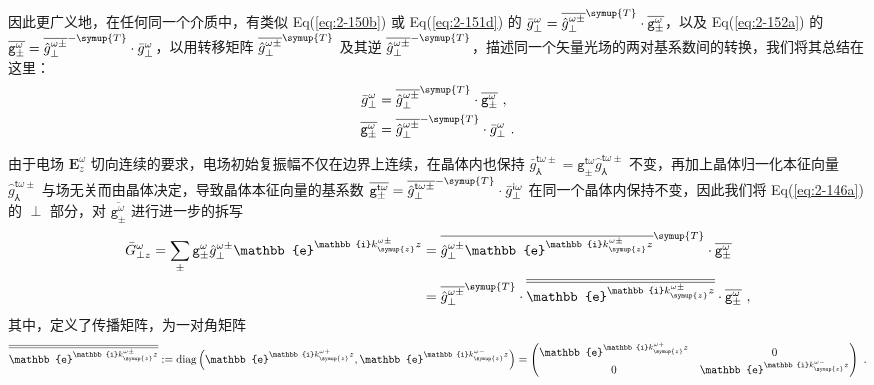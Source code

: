 因此更广义地，在任何同一个介质中，有类似 Eq(\ref{eq:2-150b}) 或 Eq(\ref{eq:2-151d}) 的 $\bar{g}^{\omega}_{\perp} = \overline{\hat{g}^{\omega\pm}_{\perp}}^{\symup{T}} \cdot \overline{{\mathtt{g}}^{\omega}_{\pm}}$，以及 Eq(\ref{eq:2-152a}) 的 $\overline{{\mathtt{g}}^{\omega}_{\pm}} = \overline{\hat{g}^{\omega\pm}_{\perp}}^{-\symup{T}} \cdot \bar{g}^{\omega}_{\perp}$，以用转移矩阵 $\overline{\hat{g}^{\omega\pm}_{\perp}}^{\symup{T}}$ 及其逆 $\overline{\hat{g}^{\omega\pm}_{\perp}}^{-\symup{T}}$，描述同一个矢量光场的两对基系数间的转换，我们将其总结在这里：
\begin{subequations} \label{eq:2-153}
	\abovedisplayskip=10pt
	\belowdisplayskip=10pt
	\begin{align}
		\bar{g}^{\omega}_{\perp} &= \overline{\hat{g}^{\omega\pm}_{\perp}}^{\symup{T}} \cdot \overline{{\mathtt{g}}^{\omega}_{\pm}} \label{eq:2-153a}~,\\ \overline{{\mathtt{g}}^{\omega}_{\pm}} &= \overline{\hat{g}^{\omega\pm}_{\perp}}^{-\symup{T}} \cdot \bar{g}^{\omega}_{\perp} \label{eq:2-153b}~.
	\end{align}
\end{subequations}

由于电场 $\symbf E^{\omega}_z$ 切向连续的要求，电场初始复振幅不仅在边界上连续，在晶体内也保持 $\bar{g}^{\mathsf{t}\omega\pm}_{\Yup} = {\mathtt{g}}^{\mathsf{t}\omega}_{\pm} \hat{g}^{\mathsf{t}\omega\pm}_{\Yup}$ 不变，再加上晶体归一化本征向量 $\hat{g}^{\mathsf{t}\omega\pm}_{\Yup}$ 与场无关而由晶体决定，导致晶体本征向量的基系数 $\overline{{\mathtt{g}}^{\mathsf{t}\omega}_{\pm}} = \overline{\hat{g}^{\mathsf{t}\omega\pm}_{\perp}}^{-\symup{T}} \cdot \bar{g}^{\mathsf{i}\omega}_{\perp}$ 在同一个晶体内保持不变，因此我们将 Eq(\ref{eq:2-146a}) 的 $\perp$ 部分，对 $\overline{{\mathtt{g}}^{\omega}_{\pm}}$ 进行进一步的拆写
\begin{subequations} \label{eq:2-154}
	\begin{align}
		\bar{G}^{\omega}_{\perp z} = \sum_{\pm} {\mathtt{g}}^{\omega}_{\pm} \hat{g}^{\omega\pm}_{\perp} \mathbb{e}^{ \mathbb{i} k^{\omega\pm}_{\symup{z}} z} &= \overline{\hat{g}^{\omega\pm}_{\perp} \mathbb{e}^{ \mathbb{i} k^{\omega\pm}_{\symup{z}} z}}^{\symup{T}} \cdot \overline{{\mathtt{g}}^{\omega}_{\pm}} \label{eq:2-154a}\\&= \overline{\hat{g}^{\omega\pm}_{\perp}}^{\symup{T}} \cdot \overline{\overline{\mathbb{e}^{ \mathbb{i} k^{\omega\pm}_{\symup{z}} z}}} \cdot \overline{{\mathtt{g}}^{\omega}_{\pm}} \label{eq:2-154b}~,
	\end{align}
\end{subequations}
其中，定义了传播矩阵，为一对角矩阵
\begin{equation} \label{eq:2-155}
	\overline{\overline{\mathbb{e}^{ \mathbb{i} k^{\omega\pm}_{\symup{z}} z}}} := \text{diag} \left(\mathbb{e}^{ \mathbb{i} k^{\omega+}_{\symup{z}} z}, \mathbb{e}^{ \mathbb{i} k^{\omega-}_{\symup{z}} z}  \right) = \begin{pmatrix} \mathbb{e}^{ \mathbb{i} k^{\omega+}_{\symup{z}} z} & 0 \\ 0 & \mathbb{e}^{ \mathbb{i} k^{\omega-}_{\symup{z}} z} \end{pmatrix}~.
\end{equation}

